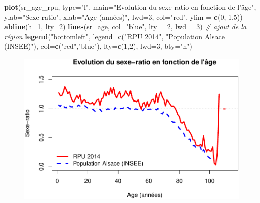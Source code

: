 \documentclass[]{article}
\newenvironment{Shaded}{\begin{snugshade}}{\end{snugshade}}
\newcommand{\KeywordTok}[1]{\textcolor[rgb]{0.13,0.29,0.53}{\textbf{{#1}}}}
\newcommand{\DataTypeTok}[1]{\textcolor[rgb]{0.13,0.29,0.53}{{#1}}}
\newcommand{\DecValTok}[1]{\textcolor[rgb]{0.00,0.00,0.81}{{#1}}}
\newcommand{\FloatTok}[1]{\textcolor[rgb]{0.00,0.00,0.81}{{#1}}}
\newcommand{\StringTok}[1]{\textcolor[rgb]{0.31,0.60,0.02}{{#1}}}
\newcommand{\CommentTok}[1]{\textcolor[rgb]{0.56,0.35,0.01}{\textit{{#1}}}}
\newcommand{\NormalTok}[1]{{#1}}
\begin{document}
\begin{Shaded}
\begin{Highlighting}[]
\KeywordTok{plot}\NormalTok{(sr_age_rpu, }\DataTypeTok{type=}\StringTok{"l"}\NormalTok{, }\DataTypeTok{main=}\StringTok{"Evolution du sexe-ratio en fonction de l'âge"}\NormalTok{, }\DataTypeTok{ylab=}\StringTok{"Sexe-ratio"}\NormalTok{, }\DataTypeTok{xlab=}\StringTok{"Age (années)"}\NormalTok{, }\DataTypeTok{lwd=}\DecValTok{3}\NormalTok{, }\DataTypeTok{col=}\StringTok{"red"}\NormalTok{, }\DataTypeTok{ylim =} \KeywordTok{c}\NormalTok{(}\DecValTok{0}\NormalTok{, }\FloatTok{1.5}\NormalTok{))}
\KeywordTok{abline}\NormalTok{(}\DataTypeTok{h=}\DecValTok{1}\NormalTok{, }\DataTypeTok{lty=}\DecValTok{2}\NormalTok{)}
\KeywordTok{lines}\NormalTok{(sr_age, }\DataTypeTok{col=}\StringTok{"blue"}\NormalTok{, }\DataTypeTok{lty =} \DecValTok{2}\NormalTok{, }\DataTypeTok{lwd =} \DecValTok{3}\NormalTok{) }\CommentTok{# ajout de la région}
\KeywordTok{legend}\NormalTok{(}\StringTok{"bottomleft"}\NormalTok{, }\DataTypeTok{legend=}\KeywordTok{c}\NormalTok{(}\StringTok{"RPU 2014"}\NormalTok{, }\StringTok{"Population Alsace (INSEE)"}\NormalTok{), }\DataTypeTok{col=}\KeywordTok{c}\NormalTok{(}\StringTok{"red"}\NormalTok{,}\StringTok{"blue"}\NormalTok{), }\DataTypeTok{lty=}\KeywordTok{c}\NormalTok{(}\DecValTok{1}\NormalTok{,}\DecValTok{2}\NormalTok{), }\DataTypeTok{lwd=}\DecValTok{3}\NormalTok{, }\DataTypeTok{bty=}\StringTok{"n"}\NormalTok{)}
\end{Highlighting}
\end{Shaded}

\begin{figure}[htbp]
\centering
\includegraphics{age_files/figure-latex/comp_sex_ratio-1.pdf}
\end{figure}
\end{document}
